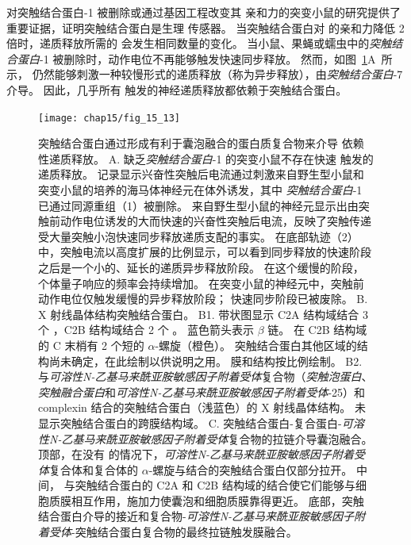 对突触结合蛋白-1 被删除或通过基因工程改变其  亲和力的突变小鼠的研究提供了重要证据，证明突触结合蛋白是生理  传感器。
当突触结合蛋白对  的亲和力降低 2 倍时，递质释放所需的  会发生相同数量的变化。
当小鼠、果蝇或蠕虫中的\textit{突触结合蛋白}-1 被删除时，动作电位不再能够触发快速同步释放。
然而，如图~\ref{fig:15_13}A~所示， 仍然能够刺激一种较慢形式的递质释放（称为异步释放），由\textit{突触结合蛋白}-7 介导。
因此，几乎所有  触发的神经递质释放都依赖于突触结合蛋白。


\begin{figure}[htbp]
	\centering
	\texttt{[image: chap15/fig\_15\_13]}
	\caption{突触结合蛋白通过形成有利于囊泡融合的蛋白质复合物来介导  依赖性递质释放。
		A. 缺乏\textit{突触结合蛋白}-1 的突变小鼠不存在快速  触发的递质释放。
		记录显示兴奋性突触后电流通过刺激来自野生型小鼠和突变小鼠的培养的海马体神经元在体外诱发，其中 \textit{突触结合蛋白}-1 已通过同源重组（1）被删除。
		来自野生型小鼠的神经元显示出由突触前动作电位诱发的大而快速的兴奋性突触后电流，反映了突触传递受大量突触小泡快速同步释放递质支配的事实。
		在底部轨迹（2）中，突触电流以高度扩展的比例显示，可以看到同步释放的快速阶段之后是一个小的、延长的递质异步释放阶段。
		在这个缓慢的阶段，个体量子响应的频率会持续增加。
		在突变小鼠的神经元中，突触前动作电位仅触发缓慢的异步释放阶段；
		快速同步阶段已被废除\cite{geppert1994synaptotagmin}。
		B. X 射线晶体结构突触结合蛋白。
		B1. 带状图显示 C2A 结构域结合 3 个 ，C2B 结构域结合 2 个 。
		蓝色箭头表示 $\beta$ 链。
		在 C2B 结构域的 C 末梢有 2 个短的 $\alpha$-螺旋（橙色）。
		突触结合蛋白其他区域的结构尚未确定，在此绘制以供说明之用。
		膜和结构按比例绘制\cite{fernandez2001three}。
		B2. 与\textit{可溶性N-乙基马来酰亚胺敏感因子附着受体}复合物（\textit{突触泡蛋白}、\textit{突触融合蛋白}和\textit{可溶性N-乙基马来酰亚胺敏感因子附着受体}-25）和 complexin 结合的突触结合蛋白（浅蓝色）的 X 射线晶体结构。
		未显示突触结合蛋白的跨膜结构域\cite{zhou2017primed}。
		C. 突触结合蛋白-复合蛋白-\textit{可溶性N-乙基马来酰亚胺敏感因子附着受体}复合物的拉链介导囊泡融合。
		顶部，在没有  的情况下，\textit{可溶性N-乙基马来酰亚胺敏感因子附着受体}复合体和复合体的 $\alpha$-螺旋与结合的突触结合蛋白仅部分拉开。
		中间， 与突触结合蛋白的 C2A 和 C2B 结构域的结合使它们能够与细胞质膜相互作用，施加力使囊泡和细胞质膜靠得更近。
		底部，突触结合蛋白介导的接近和复合物-\textit{可溶性N-乙基马来酰亚胺敏感因子附着受体}-突触结合蛋白复合物的最终拉链触发膜融合\cite{zhou2017primed}。}
	\label{fig:15_13}
\end{figure}


